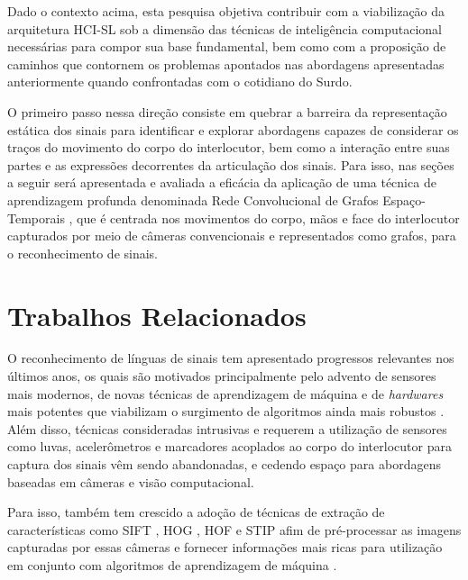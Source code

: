 Dado o contexto acima, esta pesquisa objetiva contribuir com a viabilização da arquitetura HCI-SL sob a dimensão das técnicas de inteligência computacional necessárias para compor sua base fundamental, bem como com a proposição de caminhos que contornem os problemas apontados nas abordagens apresentadas anteriormente quando confrontadas com o cotidiano do Surdo. 

O primeiro passo nessa direção consiste em quebrar a barreira da representação estática dos sinais para identificar e explorar abordagens capazes de considerar os traços do movimento do corpo do interlocutor, bem como a interação entre suas partes e as expressões decorrentes da articulação dos sinais. Para isso, nas seções a seguir será apresentada e avaliada a eficácia da aplicação de uma técnica de aprendizagem profunda denominada Rede Convolucional de Grafos Espaço-Temporais \cite{st-gcn-2018}, que é centrada nos movimentos do corpo, mãos e face do interlocutor capturados por meio de câmeras convencionais e representados como grafos, para o reconhecimento de sinais. 


\section{Trabalhos Relacionados} %

O reconhecimento de línguas de sinais tem apresentado progressos relevantes nos últimos anos, os quais são motivados principalmente pelo advento de sensores mais modernos, de novas técnicas de aprendizagem de máquina e de \textit{hardwares} mais potentes que viabilizam o surgimento de algoritmos ainda mais robustos \cite{recent-advances-dl-2017, recent-advances-sl-2013}. Além disso, técnicas consideradas intrusivas e requerem a utilização de sensores como luvas, acelerômetros e marcadores acoplados ao corpo do interlocutor para captura dos sinais vêm sendo abandonadas, e cedendo espaço para abordagens baseadas em câmeras e visão computacional.

Para isso, também tem crescido a adoção de técnicas de extração de características como SIFT \cite{sift-2004}, HOG \cite{hog-2005}, HOF \cite{hof-2008} e STIP \cite{hof-2008} \cite{recent-advances-dl-2017} afim de pré-processar as imagens capturadas por essas câmeras e fornecer informações mais ricas para utilização em conjunto com algoritmos de aprendizagem de máquina \cite{bhof-sl-2016, shanta-2018}.

